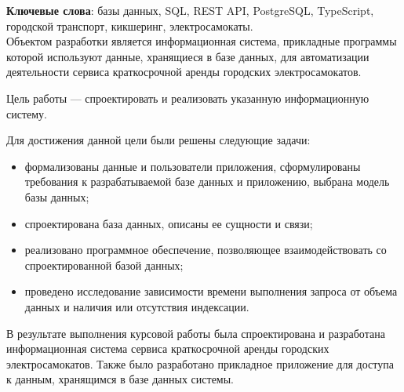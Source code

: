 \begin{essay}{}
	\noindent\textbf{Ключевые слова}: базы данных, SQL, REST API, PostgreSQL, TypeScript, городской транспорт, кикшеринг, электросамокаты.\\

	Объектом разработки является информационная система, прикладные программы которой используют данные, хранящиеся в базе данных, для автоматизации деятельности сервиса краткосрочной аренды городских электросамокатов.

	Цель работы --- спроектировать и реализовать указанную информационную систему.

	Для достижения данной цели были решены следующие задачи:

	\begin{itemize}
		\item формализованы данные и пользователи приложения, сформулированы требования к разрабатываемой базе данных и приложению, выбрана модель базы данных;
		\item спроектирована база данных, описаны ее сущности и связи;
		\item реализовано программное обеспечение, позволяющее взаимодействовать со спроектированной базой данных;
		\item проведено исследование зависимости времени выполнения запроса от объема данных и наличия или отсутствия индексации.
	\end{itemize}

	В результате выполнения курсовой работы была спроектирована и разработана информационная система сервиса краткосрочной аренды городских электросамокатов. Также было разработано прикладное приложение для доступа к данным, хранящимся в базе данных системы.
\end{essay}